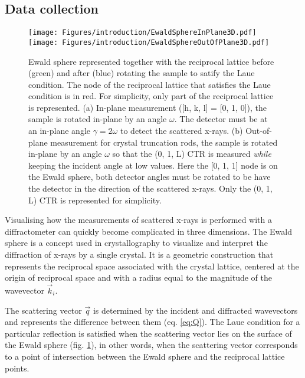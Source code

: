 \subsection{Data collection} \label{sec:DataCollectionSXRD}

\begin{figure}[!htb]
    \centering
    \texttt{[image: Figures/introduction/EwaldSphereInPlane3D.pdf]}
    \texttt{[image: Figures/introduction/EwaldSphereOutOfPlane3D.pdf]}
    \caption{
    Ewald sphere represented together with the reciprocal lattice before (green) and after (blue) rotating the sample to satify the Laue condition.
    The node of the reciprocal lattice that satisfies the Laue condition is in red.
    For simplicity, only part of the reciprocal lattice is represented.
    (a) In-plane measurement ([h, k, l] = [0, 1, 0]), the sample is rotated in-plane by an angle $\omega$.
    The detector must be at an in-plane angle $\gamma=2\omega$ to detect the scattered x-rays.
    (b) Out-of-plane measurement for crystal truncation rods, the sample is rotated in-plane by an angle $\omega$ so that the (0, 1, L) CTR is measured \textit{while} keeping the incident angle at low values.
    Here the [0, 1, 1] node is on the Ewald sphere, both detector angles must be rotated to be have the detector in the direction of the scattered x-rays.
    Only the (0, 1, L) CTR is represented for simplicity.
    }
    \label{fig:EwaldSphere}
\end{figure}

Visualising how the measurements of scattered x-rays is performed with a diffractometer can quickly become complicated in three dimensions.
The Ewald sphere is a concept used in crystallography to visualize and interpret the diffraction of x-rays by a single crystal.
It is a geometric construction that represents the reciprocal space associated with the crystal lattice, centered at the origin of reciprocal space and with a radius equal to the magnitude of the wavevector $\vec{k}_i$.

The scattering vector $\vec{q}$ is determined by the incident and diffracted wavevectors and represents the difference between them (eq. \ref{eq:Q}).
The Laue condition for a particular reflection is satisfied when the scattering vector lies on the surface of the Ewald sphere (fig. \ref{fig:EwaldSphere}), in other words, when the scattering vector corresponds to a point of intersection between the Ewald sphere and the reciprocal lattice points.

